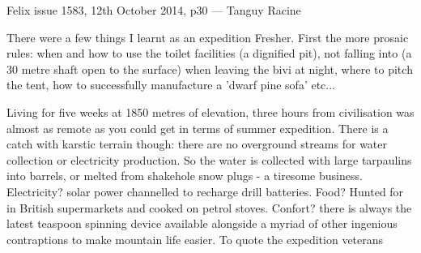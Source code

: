 \begin{marginfigure}
\checkoddpage \ifoddpage \forcerectofloat \else \forceversofloat \fi
\centering
{}
\caption{Felix issue 1583, 12th October 2014, p30 --- Tanguy Racine}
\label{felix article}
\end{marginfigure}

There were a few things I learnt as an expedition Fresher. First the more prosaic rules: when and how to use the toilet facilities (a dignified pit), not falling into  (a 30 metre shaft open to the surface) when leaving the bivi at night, where to pitch the tent, how to successfully manufacture a 'dwarf pine sofa' etc... 

Living for five weeks at 1850 metres of elevation, three hours from civilisation was almost as remote as you could get in terms of summer expedition. There is a catch with karstic terrain though: there are no overground streams for water collection or electricity production. So the water is collected with large tarpaulins into barrels, or melted from shakehole snow plugs - a tiresome business. Electricity? solar power channelled to recharge drill batteries.  Food? Hunted for in British supermarkets and cooked on petrol stoves. Confort? there is always the latest teaspoon spinning device available alongside a myriad of other ingenious contraptions to make mountain life easier. To quote the expedition veterans 

